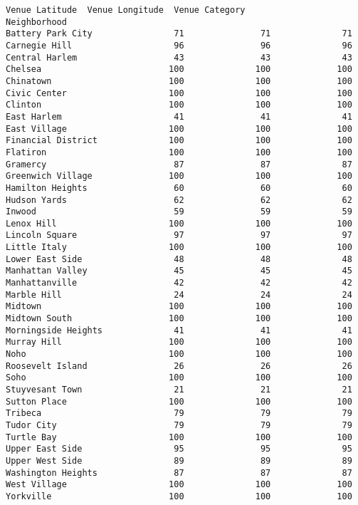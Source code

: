 \documentclass[11pt]{article}
\begin{document}
\begin{tcolorbox}[breakable, size=fbox, boxrule=.5pt, pad at break*=1mm, opacityfill=0]
\begin{Verbatim}[commandchars=\\\{\}]
                     Venue Latitude  Venue Longitude  Venue Category
Neighborhood
Battery Park City                71               71              71
Carnegie Hill                    96               96              96
Central Harlem                   43               43              43
Chelsea                         100              100             100
Chinatown                       100              100             100
Civic Center                    100              100             100
Clinton                         100              100             100
East Harlem                      41               41              41
East Village                    100              100             100
Financial District              100              100             100
Flatiron                        100              100             100
Gramercy                         87               87              87
Greenwich Village               100              100             100
Hamilton Heights                 60               60              60
Hudson Yards                     62               62              62
Inwood                           59               59              59
Lenox Hill                      100              100             100
Lincoln Square                   97               97              97
Little Italy                    100              100             100
Lower East Side                  48               48              48
Manhattan Valley                 45               45              45
Manhattanville                   42               42              42
Marble Hill                      24               24              24
Midtown                         100              100             100
Midtown South                   100              100             100
Morningside Heights              41               41              41
Murray Hill                     100              100             100
Noho                            100              100             100
Roosevelt Island                 26               26              26
Soho                            100              100             100
Stuyvesant Town                  21               21              21
Sutton Place                    100              100             100
Tribeca                          79               79              79
Tudor City                       79               79              79
Turtle Bay                      100              100             100
Upper East Side                  95               95              95
Upper West Side                  89               89              89
Washington Heights               87               87              87
West Village                    100              100             100
Yorkville                       100              100             100
\end{Verbatim}
\end{tcolorbox}
        
\end{document}
